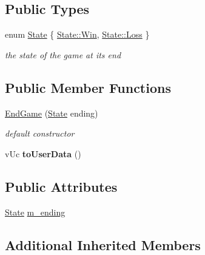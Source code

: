 \subsection*{Public Types}
\begin{DoxyCompactItemize}
\item 
enum \hyperlink{class_network_1_1_messages_1_1_end_game_ae84fe527cbd90a7ba464dbcd48f0e941}{State} \{ \hyperlink{class_network_1_1_messages_1_1_end_game_ae84fe527cbd90a7ba464dbcd48f0e941a119eac47719cc9be7b99124712e229da}{State\+::\+Win}, 
\hyperlink{class_network_1_1_messages_1_1_end_game_ae84fe527cbd90a7ba464dbcd48f0e941a14781ee5e859104d453ad3eb28b441e5}{State\+::\+Loss}
 \}\begin{DoxyCompactList}\small\item\em the state of the game at its end \end{DoxyCompactList}
\end{DoxyCompactItemize}
\subsection*{Public Member Functions}
\begin{DoxyCompactItemize}
\item 
\hyperlink{class_network_1_1_messages_1_1_end_game_a4ead99b7003dc21bc16a16a8451b0f24}{End\+Game} (\hyperlink{class_network_1_1_messages_1_1_end_game_ae84fe527cbd90a7ba464dbcd48f0e941}{State} ending)
\begin{DoxyCompactList}\small\item\em default constructor \end{DoxyCompactList}\item 
\mbox{\label{class_network_1_1_messages_1_1_end_game_a5760fb93b48f3fa2b7e5747347200fd0}} 
v\+Uc {\bfseries to\+User\+Data} ()
\end{DoxyCompactItemize}
\subsection*{Public Attributes}
\begin{DoxyCompactItemize}
\item 
\hyperlink{class_network_1_1_messages_1_1_end_game_ae84fe527cbd90a7ba464dbcd48f0e941}{State} \hyperlink{class_network_1_1_messages_1_1_end_game_a28d92c273181cd08ecc01360c23afa18}{m\+\_\+ending}
\end{DoxyCompactItemize}
\subsection*{Additional Inherited Members}


